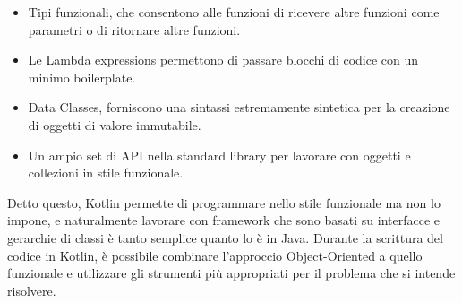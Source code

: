 \begin{itemize}
  \item Tipi funzionali, che consentono alle funzioni di ricevere altre funzioni come parametri o di ritornare altre funzioni.
  \item Le Lambda expressions permettono di passare blocchi di codice con un minimo boilerplate.
  \item Data Classes, forniscono una sintassi estremamente sintetica per la creazione di oggetti di valore immutabile.
  \item Un ampio set di API nella standard library per lavorare con oggetti e collezioni in stile funzionale.
\end{itemize}
Detto questo, Kotlin permette di programmare nello stile funzionale ma non lo impone,
e naturalmente lavorare con framework che sono basati su interfacce e gerarchie di classi
è tanto semplice quanto lo è in Java. Durante la scrittura del codice in Kotlin, è possibile
combinare l'approccio Object-Oriented a quello funzionale e utilizzare gli strumenti più appropriati
per il problema che si intende risolvere.\\

